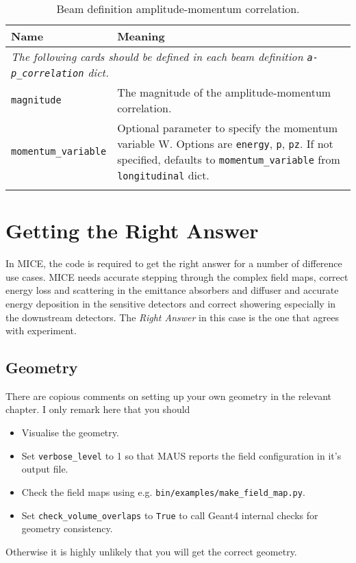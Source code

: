 \begin{table*}
\begin{center}
\caption{Beam definition amplitude-momentum correlation.}
\label{tab:apcorr}
\begin{tabularx}{\linewidth}{lX}
Name & Meaning \\
\hline
\multicolumn{2}{l}{\emph{The following cards should be defined in each beam definition \verb|a-p_correlation| dict.}} \\
\hline
\verb|magnitude| & The magnitude of the amplitude-momentum correlation. \\
\verb|momentum_variable| & Optional parameter to specify the momentum variable W. Options are \verb|energy|, \verb|p|, \verb|pz|. If not specified, defaults to \verb|momentum_variable| from \verb|longitudinal| dict.\\
\begin{makeimage} %
\end{makeimage}
\end{tabularx}
\end{center}
\end{table*}

\section{Getting the Right Answer}
In MICE, the code is required to get the right answer for a number of difference use cases. MICE needs accurate stepping through the complex field maps, correct energy loss and scattering in the emittance absorbers and diffuser and accurate energy deposition in the sensitive detectors and correct showering especially in the downstream detectors. The \emph{Right Answer} in this case is the one that agrees with experiment.

\subsection{Geometry}
There are copious comments on setting up your own geometry in the relevant chapter. I only remark here that you should
\begin{itemize}
\item Visualise the geometry.
\item Set \verb|verbose_level| to 1 so that MAUS reports the field configuration in it's output file.
\item Check the field maps using e.g. \verb|bin/examples/make_field_map.py|.
\item Set \verb|check_volume_overlaps| to \verb|True| to call Geant4 internal checks for geometry consistency.
\end{itemize}
Otherwise it is highly unlikely that you will get the correct geometry.

